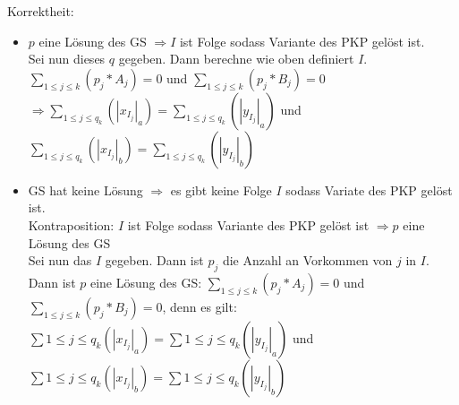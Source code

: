 \documentclass[a4paper,11pt]{scrartcl}
\begin{document}
\begin{enumerate}[label=\alph*)]
			Korrektheit:\\
			\begin{itemize}
			\item $p$ eine Lösung des GS $\Rightarrow I$ ist Folge sodass Variante des PKP gelöst ist.\\
				Sei nun dieses $q$ gegeben. Dann berechne wie oben definiert $I$.\\
				$\sum_{1 \leq j \leq k}(p_j * A_j) = 0$ und $\sum_{1 \leq j \leq k}(p_j * B_j) = 0$\\
				$ \Rightarrow \sum_{1 \leq j \leq q_k}(|x_{I_j}|_a) = \sum_{1 \leq j \leq q_k}(|y_{I_j}|_a)$ und $\sum_{1 \leq j \leq q_k}(|x_{I_j}|_b) = \sum_{1 \leq j \leq q_k}(|y_{I_j}|_b)$\\
			\item GS hat keine Lösung $\Rightarrow$ es gibt keine Folge $I$ sodass Variate des PKP gelöst ist.\\
				Kontraposition: $I$ ist Folge sodass Variante des PKP gelöst ist $\Rightarrow p$ eine Lösung des GS\\
					Sei nun das $I$ gegeben. Dann ist $p_j$ die Anzahl an Vorkommen von $j$ in $I$.\\
					Dann ist $p$ eine Lösung des GS: $\sum_{1 \leq j \leq k}(p_j * A_j) = 0$ und $\sum_{1 \leq j \leq k}(p_j * B_j) = 0$, denn es gilt:\\
					$\sum{1 \leq j \leq q_k}(|x_{I_j}|_a) = \sum{1 \leq j \leq q_k}(|y_{I_j}|_a)$ und $\sum{1 \leq j \leq q_k}(|x_{I_j}|_b) = \sum{1 \leq j \leq q_k}(|y_{I_j}|_b)$\\
			\end{itemize}
			

\end{enumerate}
\end{document}
